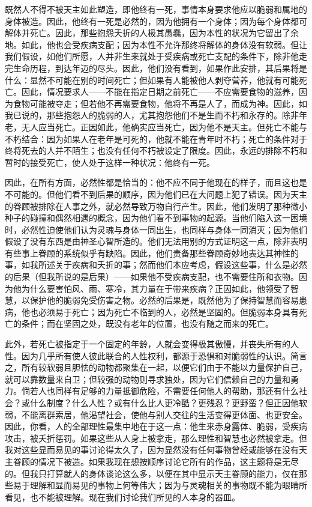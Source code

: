 既然人不得不被天主如此塑造，即他终有一死，事情本身要求他应以脆弱和属地的身体被造。因此，他终有一死是必然的，因为他拥有一个身体；因为每个身体都可解体并死亡。因此，那些抱怨夭折的人极其愚蠢，因为本性的状况为它留出了余地。如此，他也会受疾病支配；因为本性不允许那终将解体的身体没有软弱。但让我们假设，如他们所愿，人并非生来就处于受疾病或死亡支配的条件下，除非他走完生命历程，到达年迈的尽头。因此，他们没有看到，如果作此安排，其后果将是什么：显然不可能在别的时间死亡；但如果有人能被他人剥夺营养，他就有可能死亡。因此，情况要求人——不能在指定日期之前死亡——不应需要食物的滋养，因为食物可能被夺走；但若他不再需要食物，他将不再是人了，而成为神。因此，如我已说的，那些抱怨人的脆弱的人，尤其抱怨他们不是生而不朽和永存的。除非年老，无人应当死亡。正因如此，他确实应当死亡，因为他不是天主。但死亡不能与不朽结合：因为如果人在老年是可死的，他就不能在青年时不朽；死亡的条件对于终将死去的人并不陌生；也没有任何不朽被设定了限度。因此，永远的排除不朽和暂时的接受死亡，使人处于这样一种状况：他终有一死。\par

因此，在所有方面，必然性都是恰当的：他不应不同于他现在的样子，而且这也是不可能的。但他们看不到后果的顺序，因为他们已在大问题上犯了错误。因为天主的眷顾被排除在人事之外，就必然导致万物自行产生。因此，他们发明了那种微小种子的碰撞和偶然相遇的概念，因为他们看不到事物的起源。当他们陷入这一困境时，必然性迫使他们认为灵魂与身体一同出生，也同样与身体一同消灭；因为他们假设了没有东西是由神圣心智所造的。他们无法用别的方式证明这一点，除非表明有些事上眷顾的系统似乎有缺陷。因此，他们责备那些眷顾奇妙地表达其神性的事，如我所述关于疾病和夭折的事；然而他们本应考虑，假设这些事，什么是必然的后果（但我所说的是后果）——如果他不受疾病支配，也不需要住所和衣物。因为他为什么要害怕风、雨、寒冷，其力量在于带来疾病？正因如此，他领受了智慧，以保护他的脆弱免受伤害之物。必然的后果是，既然他为了保持智慧而容易患病，他也必须易于死亡；因为死亡不临到的人，必然是坚固的。但脆弱本身具有死亡的条件；而在坚固之处，既没有老年的位置，也没有随之而来的死亡。\par

此外，若死亡被指定于一个固定的年龄，人就会变得极其傲慢，并丧失所有的人性。因为几乎所有使人彼此联合的人性权利，都源于恐惧和对脆弱性的认识。简言之，所有较软弱且胆怯的动物都聚集在一起，以便它们由于不能以力量保护自己，就可以靠数量来自卫；但较强的动物则寻求独处，因为它们信赖自己的力量和勇力。倘若人也同样有足够的力量抵御危险，不需要任何他人的帮助，那还有什么社会？或什么制度？什么人性？或有什么比人更冷酷？更残忍？更野蛮？但正因他软弱，不能离群索居，他渴望社会，使他与别人交往的生活变得更体面、也更安全。因此，你看，人的全部理性最集中地在于这一点：他生来赤身露体、脆弱，受疾病攻击，被夭折惩罚。如果这些从人身上被拿走，那么理性和智慧也必然被拿走。但我对这些显而易见的事讨论得太久了，因为显然没有任何事物曾经或能够在没有天主眷顾的情况下被造。如果我现在想按顺序讨论它所有的作品，这主题将是无尽的。但我只打算就人的身体谈论这么多，以便在其中显示天主眷顾的能力，仅在那些易于理解和显而易见的事物上何等伟大；因为与灵魂相关的事物既不能为眼睛所看见，也不能被理解。现在我们讨论我们所见的人本身的器皿。\par

